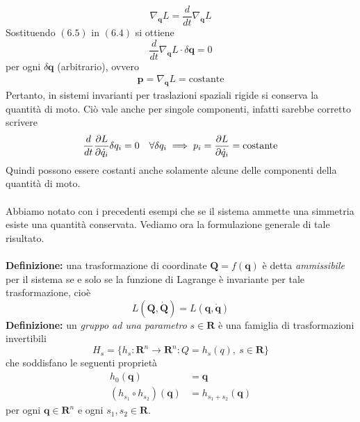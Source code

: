 \documentclass{article}
\begin{document}
\begin{equation}
    \nabla_{\mathbf{q}}L = \frac{d}{dt}\nabla_{\dot{\mathbf{q}}}L \tag{6.5}
\end{equation}
Sostituendo $(6.5)$ in $(6.4)$ si ottiene
\begin{equation}
    \frac{d}{dt}\nabla_{\dot{\mathbf{q}}}L \cdot \delta\mathbf{q} = 0 \tag{6.6}
\end{equation}
per ogni $\delta\mathbf{q}$ (arbitrario), ovvero
\begin{align}
    \mathbf{p} = \nabla_{\dot{\mathbf{q}}}L = \text{costante} \tag{6.7}
\end{align}
Pertanto, in sistemi invarianti per traslazioni spaziali rigide si conserva la quantità di moto. Ciò vale anche per singole componenti, infatti sarebbe corretto scrivere
\begin{equation}
    \frac{d}{dt}\frac{\partial L}{\partial \dot{q}_i} \delta q_i = 0 \quad \forall \delta q_i \implies p_i = \frac{\partial L}{\partial \dot{q}_i} = \text{costante} \notag
\end{equation}
Quindi possono essere costanti anche solamente alcune delle componenti della quantità di moto. \\ \\
Abbiamo notato con i precedenti esempi che se il sistema ammette una simmetria esiste una quantità conservata. Vediamo ora la formulazione generale di tale risultato. \\ \\
\textbf{Definizione:} una trasformazione di coordinate $\mathbf{Q} = f(\mathbf{q})$ è detta \textit{ammissibile} per il sistema se e solo se la funzione di Lagrange è invariante per tale trasformazione, cioè
\begin{equation}
    L(\mathbf{Q}, \dot{\mathbf{Q}}) = L(\mathbf{q}, \dot{\mathbf{q}}) \tag{6.8}
\end{equation}
\textbf{Definizione:} un \textit{gruppo ad una parametro} $s \in \mathbf{R}$ è una famiglia di trasformazioni invertibili
\begin{equation}
    H_s = \{ h_s : \mathbf{R}^n \longrightarrow \mathbf{R}^n : Q = h_s(q),\ s \in \mathbf{R} \} \tag{4.3.2}
\end{equation}
che soddisfano le seguenti proprietà
\begin{align}
    h_0(\mathbf{q}) &= \mathbf{q} \tag{6.9} \\
    (h_{s_1} \circ h_{s_2})(\mathbf{q}) &= h_{s_1 + s_2}(\mathbf{q}) \tag{6.10}
\end{align}
per ogni $\mathbf{q} \in \mathbf{R}^n$ e ogni $s_1, s_2 \in \mathbf{R}$. \\ \\
\end{document}

